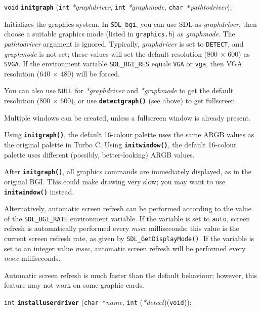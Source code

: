 \documentclass[a4paper,12pt]{article}
\newcommand{\V}{\texttt{void}}      %
\newcommand{\I}{\texttt{int}}       %
\newcommand{\C}{\texttt{char *}}    %
\newcommand{\func}[1]{\textbf{\texttt{#1}}}  %
\newcommand{\A}[1]{\emph{#1}}       %
\newcommand{\F}[1]{\texttt{#1}}     %
\newcommand{\T}[1]{\texttt{#1}}     %
\newcommand{\SDLbgi}{\texttt{SDL\_bgi}}
\newenvironment{bgi}
{ %
  \begin{snugshade}
}
{ %
  \end{snugshade}
}
\begin{document}
\begin{bgi}
\V{} \func{initgraph} (\I{} \A{*graphdriver}, \I{} \A{*graphmode},
\C{}\A{pathtodriver});
\end{bgi}

Initializes the graphics system. In \SDLbgi, you can use SDL as
\A{graphdriver}, then choose a suitable graphics mode (listed in
\F{graphics.h}) as \A{graphmode}. The \A{pathtodriver} argument is
ignored. Typically, \A{graphdriver} is set to \T{DETECT}, and
\A{graphmode} is not set; these values will set the default resolution
(800 $\times$ 600) as \T{SVGA}. If the environment variable
\T{SDL\_BGI\_RES} equals \T{VGA} or \T{vga}, then VGA resolution (640
$\times$ 480) will be forced.

You can also use \T{NULL} for \A{*graphdriver} and \A{*graphmode} to
get the default resolution (800 $\times$ 600), or use
\func{detectgraph()} (see above) to get fullscreen.

Multiple windows can be created, unless a fullscreen window is already
present.

Using \func{initgraph()}, the default 16-colour palette uses the same
ARGB values as the original palette in Turbo C. Using
\func{initwindow()}, the default 16-colour palette uses different
(possibly, better-looking) ARGB values.

After \func{initgraph()}, all graphics commands are immediately
displayed, as in the original BGI. This could make drawing very slow;
you may want to use \func{initwindow()} instead.

Alternatively, automatic screen refresh can be performed according to
the value of the \T{SDL\_BGI\_RATE} environment variable. If the
variable is set to \T{auto}, screen refresh is automatically performed
every \A{msec} milliseconds; this value is the current screen refresh
rate, as given by \T{SDL\_GetDisplayMode()}. If the variable is set to
an integer value \A{msec}, automatic screen refresh will be performed
every \A{msec} milliseconds.

Automatic screen refresh is much faster than the default behaviour;
however, this feature may not work on some graphic cards.


\addcontentsline{toc}{subsection}{\T{installuserdriver()}}
\label{sec:installuserdriver}

\begin{bgi}
\I{} \func{installuserdriver} (\C{}\A{name}, \I{} (\A{*detect})(\V{}));
\end{bgi}
\end{document}
